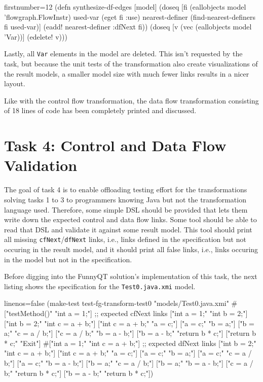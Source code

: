 \documentclass[11pt]{article}
\begin{document}
\begin{clojurecode*}{firstnumber=12}
(defn synthesize-df-edges [model]
  (doseq [fi (eallobjects model 'flowgraph.FlowInstr)
          used-var (eget fi :use)
          nearest-definer (find-nearest-definers fi used-var)]
    (eadd! nearest-definer :dfNext fi))
  (doseq [v (vec (eallobjects model 'Var))]
    (edelete! v)))
\end{clojurecode*}

Lastly, all \verb|Var| elements in the model are deleted.  This isn't requested
by the task, but because the unit tests of the transformation also create
visualizations of the result models, a smaller model size with much fewer links
results in a nicer layout.

Like with the control flow transformation, the data flow transformation
consisting of 18 lines of code has been completely printed and discussed.


\section{Task 4: Control and Data Flow Validation}
\label{sec:task-4}

The goal of task 4 is to enable offloading testing effort for the
transformations solving tasks 1 to 3 to programmers knowing Java but not the
transformation language used.  Therefore, some simple DSL should be provided
that lets them write down the expected control and data flow links.  Some tool
should be able to read that DSL and validate it against some result model.
This tool should print all missing \verb|cfNext|/\verb|dfNext| links, i.e.,
links defined in the specification but not occuring in the result model, and it
should print all false links, i.e., links occuring in the model but not in the
specification.

Before digging into the FunnyQT solution's implementation of this task, the
next listing shows the specification for the \verb|Test0.java.xmi| model.

\begin{clojurecode*}{linenos=false}
(make-test test-fg-transform-test0 "models/Test0.java.xmi"
           #{["testMethod()"   "int a = 1;"]     ;; expected cfNext links
             ["int a = 1;"     "int b = 2;"]
             ["int b = 2;"     "int c = a + b;"]
             ["int c = a + b;" "a = c;"]
             ["a = c;"         "b = a;"]
             ["b = a;"         "c = a / b;"]
             ["c = a / b;"     "b = a - b;"]
             ["b = a - b;"     "return b * c;"]
             ["return b * c;"  "Exit"]}
           #{["int a = 1;"     "int c = a + b;"] ;; expected dfNext links
             ["int b = 2;"     "int c = a + b;"]
             ["int c = a + b;" "a = c;"]
             ["a = c;"         "b = a;"]
             ["a = c;"         "c = a / b;"]
             ["a = c;"         "b = a - b;"]
             ["b = a;"         "c = a / b;"]
             ["b = a;"         "b = a - b;"]
             ["c = a / b;"     "return b * c;"]
             ["b = a - b;"     "return b * c;"]})
\end{clojurecode*}
\end{document}
